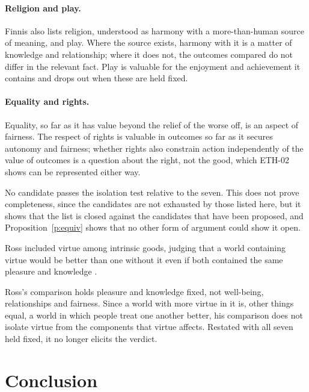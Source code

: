 \documentclass{situationist-preprint}
\begin{document}
\paragraph{Religion and play.} Finnis also lists religion, understood as harmony with a more-than-human source of meaning, and play. Where the source exists, harmony with it is a matter of knowledge and relationship; where it does not, the outcomes compared do not differ in the relevant fact. Play is valuable for the enjoyment and achievement it contains and drops out when these are held fixed.

\paragraph{Equality and rights.} Equality, so far as it has value beyond the relief of the worse off, is an aspect of fairness. The respect of rights is valuable in outcomes so far as it secures autonomy and fairness; whether rights also constrain action independently of the value of outcomes is a question about the right, not the good, which ETH-02 shows can be represented either way.

No candidate passes the isolation test relative to the seven. This does not prove completeness, since the candidates are not exhausted by those listed here, but it shows that the list is closed against the candidates that have been proposed, and Proposition~\ref{p:equiv} shows that no other form of argument could show it open.

\begin{objection}
Ross included virtue among intrinsic goods, judging that a world containing virtue would be better than one without it even if both contained the same pleasure and knowledge \citep{Ross1930}.
\end{objection}

\begin{reply}
Ross's comparison holds pleasure and knowledge fixed, not well-being, relationships and fairness. Since a world with more virtue in it is, other things equal, a world in which people treat one another better, his comparison does not isolate virtue from the components that virtue affects. Restated with all seven held fixed, it no longer elicits the verdict.
\end{reply}

\section{Conclusion}
\end{document}
